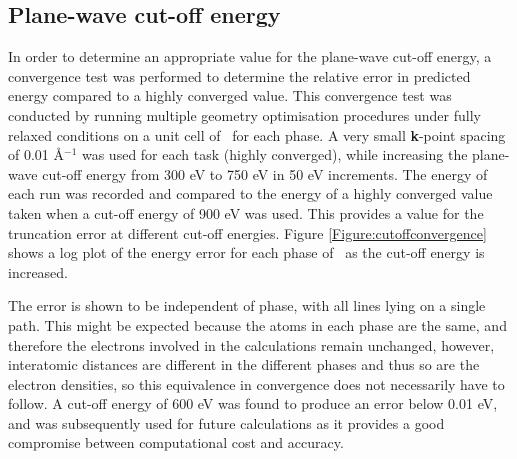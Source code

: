 \subsection{Plane-wave cut-off energy}

In order to determine an appropriate value for the plane-wave cut-off energy, a convergence test was performed to determine the relative error in predicted energy compared to a highly converged value. This convergence test was conducted by running multiple geometry optimisation procedures under fully relaxed conditions on a unit cell of \zirconia\ for each phase. A very small \textbf{k}-point spacing of 0.01 \r{A}$^{-1}$ was used for each task (highly converged), while increasing the plane-wave cut-off energy from 300 eV to 750 eV in 50 eV increments. The energy of each run was recorded and compared to the energy of a highly converged value taken when a cut-off energy of 900 eV was used. This provides a value for the truncation error at different cut-off energies. Figure \ref{Figure:cutoffconvergence} shows a log plot of the energy error for each phase of \zirconia\ as the cut-off energy is increased. 

The error is shown to be independent of phase, with all lines lying on a single path. This might be expected because the atoms in each phase are the same, and therefore the electrons involved in the calculations remain unchanged, however, interatomic distances are different in the different phases and thus so are the electron densities, so this equivalence in convergence does not necessarily have to follow. A cut-off energy of 600 eV was found to produce an error below 0.01 eV, and was subsequently used for future calculations as it provides a good compromise between computational cost and accuracy.


